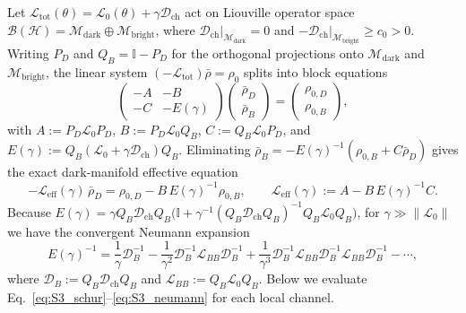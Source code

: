 \documentclass[onecolumn,10pt,notitlepage,amsmath,amssymb,floatfix]{revtex4-2}
\theoremstyle{plain}
\theoremstyle{definition}
\begin{document}
Let $\mathcal{L}_{\mathrm{tot}}(\theta) = \mathcal{L}_0(\theta) + \gamma \mathcal{D}_{\mathrm{ch}}$ act on Liouville operator space $\mathcal{B}(\mathcal{H}) = \mathcal{M}_{\mathrm{dark}} \oplus \mathcal{M}_{\mathrm{bright}}$, where $\mathcal{D}_{\mathrm{ch}}\big|_{\mathcal{M}_{\mathrm{dark}}} = 0$ and $-\mathcal{D}_{\mathrm{ch}}\big|_{\mathcal{M}_{\mathrm{bright}}} \ge c_0 > 0$. Writing $P_D$ and $Q_B = \mathbb{I} - P_D$ for the orthogonal projections onto $\mathcal{M}_{\mathrm{dark}}$ and $\mathcal{M}_{\mathrm{bright}}$, the linear system $(-\mathcal{L}_{\mathrm{tot}})\bar{\rho} = \rho_0$ splits into block equations
\begin{equation}
\label{eq:S3_blocks}
\begin{pmatrix} -A & -B \\ -C & -E(\gamma) \end{pmatrix}
\begin{pmatrix} \bar{\rho}_D \\ \bar{\rho}_B \end{pmatrix}
= \begin{pmatrix} \rho_{0,D} \\ \rho_{0,B} \end{pmatrix},
\end{equation}
with $A := P_D \mathcal{L}_0 P_D$, $B := P_D \mathcal{L}_0 Q_B$, $C := Q_B \mathcal{L}_0 P_D$, and $E(\gamma) := Q_B(\mathcal{L}_0 + \gamma \mathcal{D}_{\mathrm{ch}})Q_B$. Eliminating $\bar{\rho}_B = -E(\gamma)^{-1}(\rho_{0,B} + C\bar{\rho}_D)$ gives the exact dark-manifold effective equation
\begin{equation}
\label{eq:S3_schur}
-\mathcal{L}_{\mathrm{eff}}(\gamma)\,\bar{\rho}_D = \rho_{0,D} - B\,E(\gamma)^{-1}\rho_{0,B}, \qquad
\mathcal{L}_{\mathrm{eff}}(\gamma) := A - B\,E(\gamma)^{-1} C.
\end{equation}
Because $E(\gamma) = \gamma Q_B \mathcal{D}_{\mathrm{ch}} Q_B \big(\mathbb{I} + \gamma^{-1} (Q_B\mathcal{D}_{\mathrm{ch}}Q_B)^{-1} Q_B\mathcal{L}_0 Q_B\big)$, for $\gamma \gg \|\mathcal{L}_0\|$ we have the convergent Neumann expansion
\begin{equation}
\label{eq:S3_neumann}
E(\gamma)^{-1} = \frac{1}{\gamma} \mathcal{D}_B^{-1} - \frac{1}{\gamma^2}\mathcal{D}_B^{-1} \mathcal{L}_{BB} \mathcal{D}_B^{-1} + \frac{1}{\gamma^3}\mathcal{D}_B^{-1} \mathcal{L}_{BB} \mathcal{D}_B^{-1} \mathcal{L}_{BB} \mathcal{D}_B^{-1} - \cdots,
\end{equation}
where $\mathcal{D}_B := Q_B\mathcal{D}_{\mathrm{ch}}Q_B$ and $\mathcal{L}_{BB} := Q_B\mathcal{L}_0 Q_B$. Below we evaluate Eq.~\eqref{eq:S3_schur}--\eqref{eq:S3_neumann} for each local channel.
\end{document}
